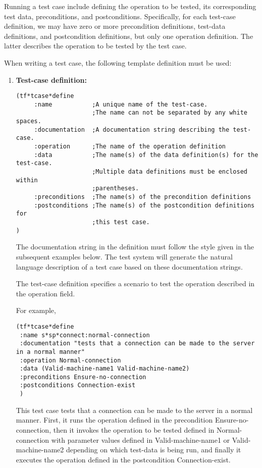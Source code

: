 Running a test case include defining the operation to be tested, 
its corresponding test data, preconditions, and postconditions. 
Specifically, for each test-case definition, we may have  zero or
more precondition definitions, test-data definitions,
and postcondition definitions, but only one operation
definition.  The latter describes the operation to be tested
by the test case.

When writing a test case, the following template definition must be used:

\begin {enumerate}
\item {\bf Test-case definition:}

\small\begin{verbatim}
(tf*tcase*define
     :name           ;A unique name of the test-case. 
                     ;The name can not be separated by any white spaces.
     :documentation  ;A documentation string describing the test-case.
     :operation      ;The name of the operation definition 
     :data           ;The name(s) of the data definition(s) for the test-case.
                     ;Multiple data definitions must be enclosed within 
                     ;parentheses.
     :preconditions  ;The name(s) of the precondition definitions 
     :postconditions ;The name(s) of the postcondition definitions for 
                     ;this test case.
)	
\end{verbatim}\normalsize

The documentation string in the definition must follow the style given
in the subsequent examples below.  The test system will generate
the natural language description of a test case based on these documentation
strings.

The test-case definition specifies a scenario to test the operation described
in the operation field.  

\noindent For example, 

\small\begin{verbatim}
(tf*tcase*define
 :name s*sp*connect:normal-connection
 :documentation "tests that a connection can be made to the server in a normal manner"
 :operation Normal-connection
 :data (Valid-machine-name1 Valid-machine-name2)
 :preconditions Ensure-no-connection
 :postconditions Connection-exist
 )
\end{verbatim}\normalsize

This test case tests that a connection can be made to the server in a normal
manner.  First, it runs the operation defined in the precondition 
Ensure-no-connection, then it invokes the operation to be tested defined
in  Normal-connection with parameter values defined in Valid-machine-name1
or Valid-machine-name2 depending on which test-data is being run, and
finally it executes the operation defined in the postcondition 
Connection-exist.


\end{enumerate}
